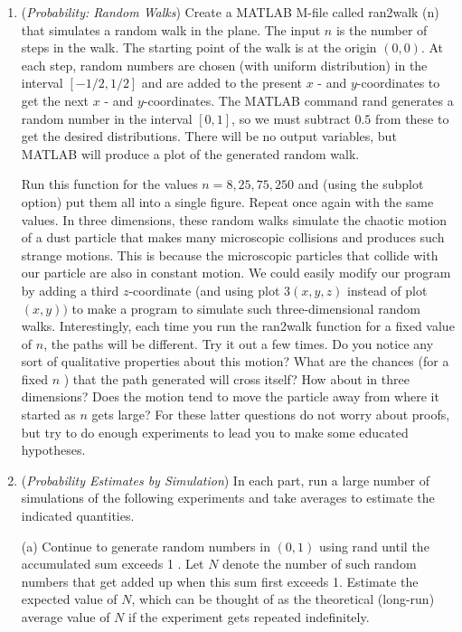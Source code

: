 \documentclass[../main.tex]{subfiles}
\begin{document}
\begin{enumerate}
\item (\emph{Probability: Random Walks}) Create a MATLAB M-file called ran2walk (n) that simulates a random walk in the plane. The input $n$ is the number of steps in the walk. The starting point of the walk is at the origin $(0,0)$. At each step, random numbers are chosen (with uniform distribution) in the interval $[-1 / 2,1 / 2]$ and are added to the present $x$ - and $y$-coordinates to get the next $x$ - and $y$-coordinates. The MATLAB command rand generates a random number in the interval $[0,1]$, so we must subtract $0.5$ from these to get the desired distributions. There will be no output variables, but MATLAB will produce a plot of the generated random walk.

Run this function for the values $n=8,25,75,250$ and (using the subplot option) put them all into a single figure. Repeat once again with the same values. In three dimensions, these random walks simulate the chaotic motion of a dust particle that makes many microscopic collisions and produces such strange motions. This is because the microscopic particles that collide with our particle are also in constant motion. We could easily modify our program by adding a third $z$-coordinate (and using plot $3(x, y, z)$ instead of plot $(x, y))$ to make a program to simulate such three-dimensional random walks. Interestingly, each time you run the ran2walk function for a fixed value of $n$, the paths will be different. Try it out a few times. Do you notice any sort of qualitative properties about this motion? What are the chances (for a fixed $n$ ) that the path generated will cross itself? How about in three dimensions? Does the motion tend to move the particle away from where it started as $n$ gets large? For these latter questions do not worry about proofs, but try to do enough experiments to lead you to make some educated hypotheses.

\item(\emph{Probability Estimates by Simulation}) In each part, run a large number of simulations of the following experiments and take averages to estimate the indicated quantities.

(a) Continue to generate random numbers in $(0,1)$ using rand until the accumulated sum exceeds 1 . Let $N$ denote the number of such random numbers that get added up when this sum first exceeds 1. Estimate the expected value of $N$, which can be thought of as the theoretical (long-run) average value of $N$ if the experiment gets repeated indefinitely.


\end{enumerate}
\end{document}

